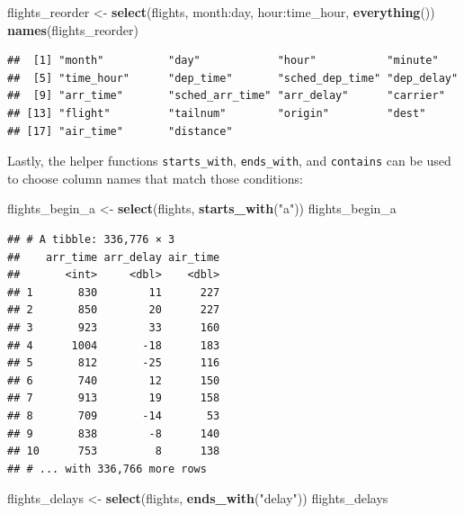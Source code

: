 \documentclass[]{tufte-book}
\newenvironment{Shaded}{\begin{snugshade}}{\end{snugshade}}
\newcommand{\KeywordTok}[1]{\textcolor[rgb]{0.13,0.29,0.53}{\textbf{{#1}}}}
\newcommand{\StringTok}[1]{\textcolor[rgb]{0.31,0.60,0.02}{{#1}}}
\newcommand{\NormalTok}[1]{{#1}}
\begin{document}
\begin{Shaded}
\begin{Highlighting}[]
\NormalTok{flights_reorder <-}\StringTok{ }\KeywordTok{select}\NormalTok{(flights, month:day, hour:time_hour, }\KeywordTok{everything}\NormalTok{())}
\KeywordTok{names}\NormalTok{(flights_reorder)}
\end{Highlighting}
\end{Shaded}

\begin{verbatim}
##  [1] "month"          "day"            "hour"           "minute"        
##  [5] "time_hour"      "dep_time"       "sched_dep_time" "dep_delay"     
##  [9] "arr_time"       "sched_arr_time" "arr_delay"      "carrier"       
## [13] "flight"         "tailnum"        "origin"         "dest"          
## [17] "air_time"       "distance"
\end{verbatim}

Lastly, the helper functions \texttt{starts\_with}, \texttt{ends\_with},
and \texttt{contains} can be used to choose column names that match
those conditions:

\begin{Shaded}
\begin{Highlighting}[]
\NormalTok{flights_begin_a <-}\StringTok{ }\KeywordTok{select}\NormalTok{(flights, }\KeywordTok{starts_with}\NormalTok{(}\StringTok{"a"}\NormalTok{))}
\NormalTok{flights_begin_a}
\end{Highlighting}
\end{Shaded}

\begin{verbatim}
## # A tibble: 336,776 × 3
##    arr_time arr_delay air_time
##       <int>     <dbl>    <dbl>
## 1       830        11      227
## 2       850        20      227
## 3       923        33      160
## 4      1004       -18      183
## 5       812       -25      116
## 6       740        12      150
## 7       913        19      158
## 8       709       -14       53
## 9       838        -8      140
## 10      753         8      138
## # ... with 336,766 more rows
\end{verbatim}

\begin{Shaded}
\begin{Highlighting}[]
\NormalTok{flights_delays <-}\StringTok{ }\KeywordTok{select}\NormalTok{(flights, }\KeywordTok{ends_with}\NormalTok{(}\StringTok{"delay"}\NormalTok{))}
\NormalTok{flights_delays}
\end{Highlighting}
\end{Shaded}
\end{document}
